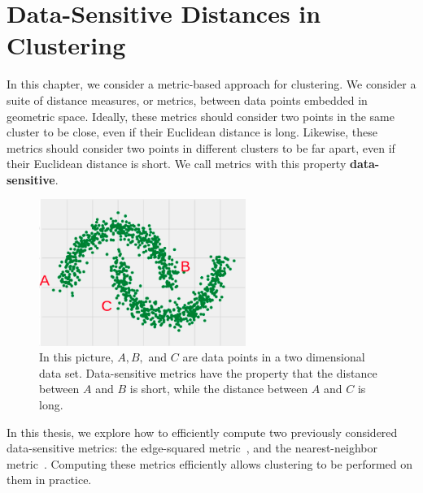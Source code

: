 \section{Data-Sensitive Distances in Clustering}\label{sec:ds}
%
 In this chapter, we consider a metric-based approach for clustering.  We consider a suite
  of distance measures, or metrics, between data points embedded in
  geometric space. Ideally, these metrics should consider two
  points in the same cluster to be close, even if their
  Euclidean distance is long. Likewise, these metrics should consider two points in different clusters
  to be far apart, even if their Euclidean distance is short.
  We call metrics with this property \textbf{data-sensitive}.

\begin{figure}[H]
\centering
\includegraphics[width=0.6\textwidth]{images/two-moons.png}
\caption{
  In this picture, $A, B,$ and $C$ are data points in a two dimensional
    data set. Data-sensitive metrics have the property that the distance
    between $A$ and $B$ is short, while the distance between $A$ and $C$
    is long. 
 }
\label{fig:spec}
\end{figure}

  In this
  thesis, we explore how to efficiently compute two previously
  considered data-sensitive metrics: the edge-squared
  metric~\cite{vincent03}, and
  the nearest-neighbor metric~\cite{cohen15approximating}. Computing
  these metrics efficiently allows clustering to be performed on them in
  practice.


